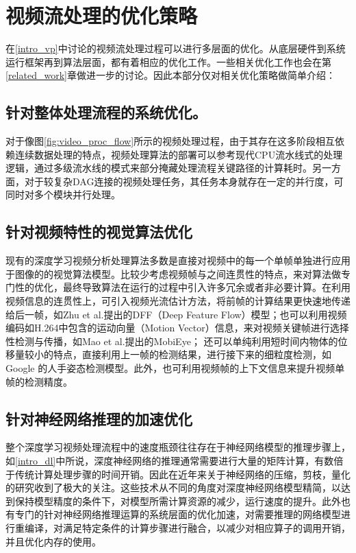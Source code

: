 \section{视频流处理的优化策略}\label{intro_opt}
在\ref{intro_vp}中讨论的视频流处理过程可以进行多层面的优化。从底层硬件到系统运行框架再到算法层面，都有着相应的优化工作。一些相关优化工作也会在第\ref{related_work}章做进一步的讨论。因此本部分仅对相关优化策略做简单介绍：\par

\subsection{针对整体处理流程的系统优化。}\label{sub:sys_opt}
对于像图\ref{fig:video_proc_flow}所示的视频处理过程，由于其存在这多阶段相互依赖连续数据处理的特点，视频处理算法的部署可以参考现代CPU流水线式的处理逻辑，通过多级流水线的模式来部分掩藏处理流程关键路径的计算耗时。另一方面，对于较复杂DAG连接的视频处理任务，其任务本身就存在一定的并行度，可同时对多个模块并行处理。
\subsection{针对视频特性的视觉算法优化}\label{sub:algo_opt}
现有的深度学习视频分析处理算法多数是直接对视频中的每一个单帧单独进行应用于图像的的视觉算法模型。比较少考虑视频帧与之间连贯性的特点，来对算法做专门性的优化，最终导致算法在运行的过程中引入许多冗余或者非必要计算。在利用视频信息的连贯性上，可引入视频光流估计方法，将前帧的计算结果更快速地传递给后一帧，如Zhu et al.提出的DFF（Deep Feature Flow）模型\cite{zhu2017deep}；也可以利用视频编码如H.264\cite{tourapis2003fast}中包含的运动向量（Motion Vector）信息，来对视频关键帧进行选择性检测与传播，如Mao et al.提出的MobiEye\cite{mao2019mobieye}；
还可以单纯利用短时间内物体的位移量较小的特点，直接利用上一帧的检测结果，进行接下来的细粒度检测，如Google 的人手姿态检测模型\cite{lugaresi2019mediapipe}。此外，也可利用视频帧的上下文信息来提升视频单帧的检测精度\cite{zhu2017flow}。
\subsection{针对神经网络推理的加速优化}\label{sub:infer_opt}
整个深度学习视频处理流程中的速度瓶颈往往存在于神经网络模型的推理步骤上，如\ref{intro_dl}中所说，深度神经网络的推理通常需要进行大量的矩阵计算，有数倍于传统计算处理步骤的时间开销。因此在近年来关于神经网络的压缩，剪枝，量化的研究收到了极大的关注。这些技术从不同的角度对深度神经网络模型精简，以达到保持模型精度的条件下，对模型所需计算资源的减少，运行速度的提升。此外也有专门的针对神经网络推理运算的系统层面的优化加速，对需要推理的网络模型进行重编译，对满足特定条件的计算步骤进行融合，以减少对相应算子的调用开销，并且优化内存的使用。

